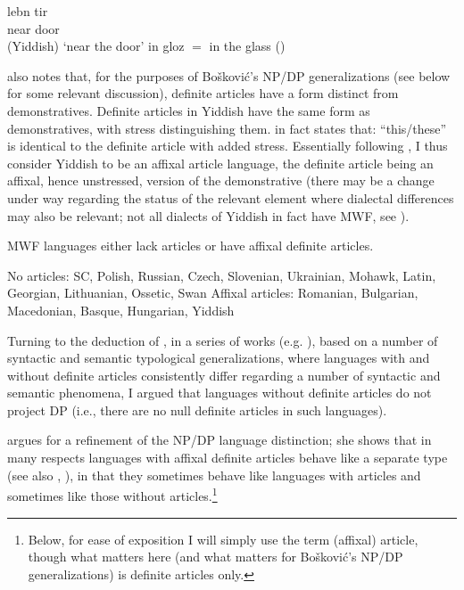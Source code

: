 \documentclass[output=paper,colorlinks,citecolor=brown]{langscibook}
\begin{document}
{\ea \label{ex:bosk:yid} 
\ea \label{ex:bosk:yida}
\gll lebn tir\\
near door\\\hfill (Yiddish)
\glt `near the door'
\ex in gloz $=$ in the glass\label{ex:bosk:yidb} \hfill (\citealt{Zwicky1984})        
\z 
\z 

\noindent \citet{Bošković2016} also notes that, for the purposes of Bošković's NP/DP generalizations (see below for some relevant discussion), definite articles have a form distinct from demonstratives. Definite articles in Yiddish have the same form as demonstratives, with stress distinguishing them. \citet[122]{Margolis2011} in fact states that: “this/these” is identical to the definite article with added stress. Essentially following \citet{Oda2022}, I thus consider Yiddish to be an affixal article language, the definite article being an affixal, hence unstressed, version of the demonstrative (there may be a change under way regarding the status of the relevant element where dialectal differences may also be relevant; not all dialects of Yiddish in fact have MWF, see \citealt{Diesing2003}).}

 
\ea\label{ex:bosk:23}
MWF languages either lack articles or have affixal definite articles.
\z 

\ea\label{ex:bosk:24}
\ea No articles: SC, Polish, Russian, Czech, Slovenian, Ukrainian, Mohawk, Latin, Georgian, Lithuanian, Ossetic, Swan\label{ex:bosk:24a}
\ex Affixal articles: Romanian, Bulgarian, Macedonian, Basque, Hungarian, Yiddish\label{ex:bosk:24b}
\z 
\z 

\noindent Turning to the deduction of , in a series of works (e.g. \citealt{Bošković2012}), based on a number of syntactic and semantic typological generalizations, where languages with and without definite articles consistently differ regarding a number of syntactic and semantic phenomena, I argued that languages without definite articles do not project DP (i.e., there are no null definite articles in such languages).

\citet{Talić2017} argues for a refinement of the NP/DP language distinction; she shows that in many respects languages with affixal definite articles behave like a separate type (see also \citealt{Oda2022}, \citealt{Lewis2024}), in that they sometimes behave like languages with articles and sometimes like those without articles.\footnote{Below, for ease of exposition I will simply use the term (affixal) article, though what matters here (and what matters for Bošković's NP/DP generalizations) is definite articles only.}
\end{document}
